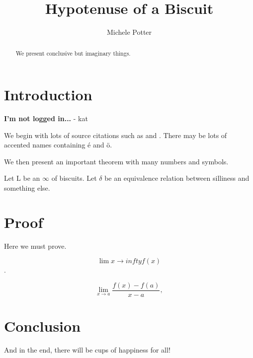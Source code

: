\documentclass{article}
\title{Hypotenuse of a Biscuit}
\author{Michele Potter}
\begin{document}
\maketitle

\begin{abstract}
    We present conclusive but imaginary things.
\end{abstract}
\section{Introduction}
\textbf{I'm not logged in...}  - kat


We begin with lots of source citations such as \cite{pmid:10333997} and \cite{pmid:21394130}. There may be lots of accented names containing \'e and \"o. 

We then present an important theorem with many numbers and symbols.

Let L be an $\infty$ of biscuits. Let $\delta$ be an equivalence relation between silliness and something else.

\section{Proof}

Here we must prove.

$$\lim{x \to infty} f(x)$$.

$$\lim_{x \to a} \frac{f(x)-f(a)}{x-a},$$

\section{Conclusion}
And in the end, there will be cups of happiness for all!







\printbibliography
\end{document}

